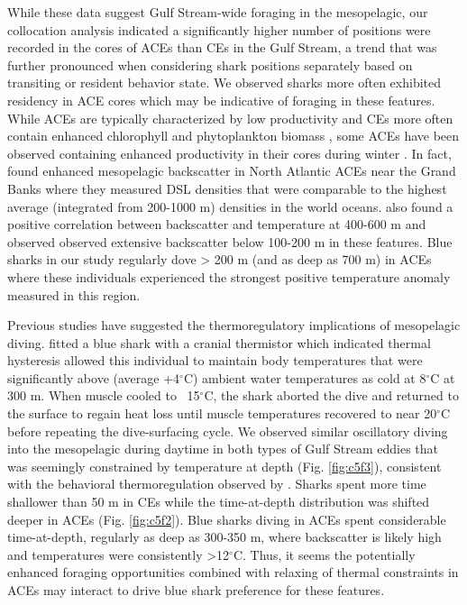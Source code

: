 While these data suggest Gulf Stream-wide foraging in the mesopelagic, our collocation analysis indicated a significantly higher number of positions were recorded in the cores of ACEs than CEs in the Gulf Stream, a trend that was further pronounced when considering shark positions separately based on transiting or resident behavior state. We observed sharks more often exhibited residency in ACE cores which may be indicative of foraging \citep{Breed2009} in these features. While ACEs are typically characterized by low productivity and CEs more often contain enhanced chlorophyll and phytoplankton biomass \citep{Gaube2017DSR}, some ACEs have been observed containing enhanced productivity in their cores during winter \citep{Dufois2016}. In fact, \cite{Fennell2015} found enhanced mesopelagic backscatter in North Atlantic ACEs near the Grand Banks where they measured DSL densities that were comparable to the highest average (integrated from 200-1000 m) densities in the world oceans. \cite{Fennell2015} also found a positive correlation between backscatter and temperature at 400-600 m and observed observed extensive backscatter below 100-200 m in these features. Blue sharks in our study regularly dove > 200 m (and as deep as 700 m) in ACEs where these individuals experienced the strongest positive temperature anomaly measured in this region.

Previous studies have suggested the thermoregulatory implications of mesopelagic diving. \citep{Carey1990} fitted a blue shark with a cranial thermistor which indicated thermal hysteresis allowed this individual to maintain body temperatures that were significantly above (average +4$^\circ$C) ambient water temperatures as cold at 8$^\circ$C at 300 m. When muscle cooled to ~15$^\circ$C, the shark aborted the dive and returned to the surface to regain heat loss until muscle temperatures recovered to near 20$^\circ$C before repeating the dive-surfacing cycle. We observed similar oscillatory diving into the mesopelagic during daytime in both types of Gulf Stream eddies that was seemingly constrained by temperature at depth (Fig. \cref{fig:c5f3}), consistent with the behavioral thermoregulation observed by \cite{Carey1990}. Sharks spent more time shallower than 50 m in CEs while the time-at-depth distribution was shifted deeper in ACEs (Fig. \cref{fig:c5f2}). Blue sharks diving in ACEs spent considerable time-at-depth, regularly as deep as 300-350 m, where backscatter is likely high \citep{Fennell2015} and temperatures were consistently >12$^\circ$C. Thus, it seems the potentially enhanced foraging opportunities combined with relaxing of thermal constraints in ACEs may interact to drive blue shark preference for these features.

